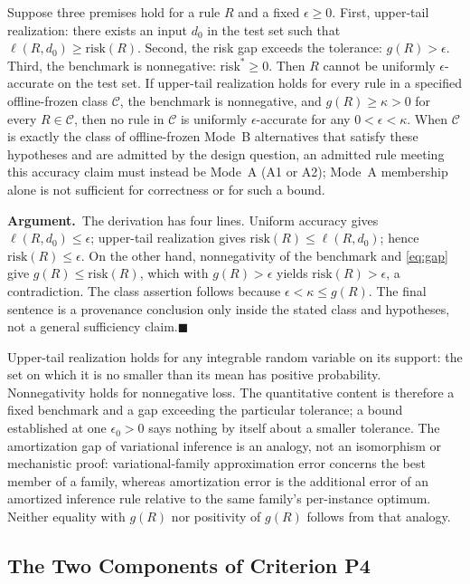\documentclass[twoside,11pt]{article}
\newcommand{\argument}{\par\medskip\noindent\textbf{Argument.}\ }
\newcommand{\qedbox}{\hfill$\blacksquare$}
\begin{document}
\begin{lemma}
Suppose three premises hold for a rule $R$ and a fixed $\epsilon\geq0$. First, upper-tail realization: there exists an input $d_0$ in the test set such that $\ell(R,d_0)\geq\mathrm{risk}(R)$. Second, the risk gap exceeds the tolerance: $g(R)>\epsilon$. Third, the benchmark is nonnegative: $\mathrm{risk}^*\geq0$. Then $R$ cannot be uniformly $\epsilon$-accurate on the test set. If upper-tail realization holds for every rule in a specified offline-frozen class $\mathcal{C}$, the benchmark is nonnegative, and $g(R)\geq\kappa>0$ for every $R\in\mathcal{C}$, then no rule in $\mathcal{C}$ is uniformly $\epsilon$-accurate for any $0<\epsilon<\kappa$. When $\mathcal{C}$ is exactly the class of offline-frozen Mode~B alternatives that satisfy these hypotheses and are admitted by the design question, an admitted rule meeting this accuracy claim must instead be Mode~A (A1 or A2); Mode~A membership alone is not sufficient for correctness or for such a bound.
\label{lem:risk}%
\end{lemma}

\argument The derivation has four lines. Uniform accuracy gives $\ell(R,d_0)\leq\epsilon$; upper-tail realization gives $\mathrm{risk}(R)\leq\ell(R,d_0)$; hence $\mathrm{risk}(R)\leq\epsilon$. On the other hand, nonnegativity of the benchmark and \eqref{eq:gap} give $g(R)\leq\mathrm{risk}(R)$, which with $g(R)>\epsilon$ yields $\mathrm{risk}(R)>\epsilon$, a contradiction. The class assertion follows because $\epsilon<\kappa\leq g(R)$. The final sentence is a provenance conclusion only inside the stated class and hypotheses, not a general sufficiency claim.\qedbox

Upper-tail realization holds for any integrable random variable on its support: the set on which it is no smaller than its mean has positive probability. Nonnegativity holds for nonnegative loss. The quantitative content is therefore a fixed benchmark and a gap exceeding the particular tolerance; a bound established at one $\epsilon_0>0$ says nothing by itself about a smaller tolerance. The amortization gap of variational inference \citep{cremer2018} is an analogy, not an isomorphism or mechanistic proof: variational-family approximation error concerns the best member of a family, whereas amortization error is the additional error of an amortized inference rule relative to the same family's per-instance optimum. Neither equality with $g(R)$ nor positivity of $g(R)$ follows from that analogy.

\subsection{The Two Components of Criterion P4}
\label{sec:p4}%
\end{document}
